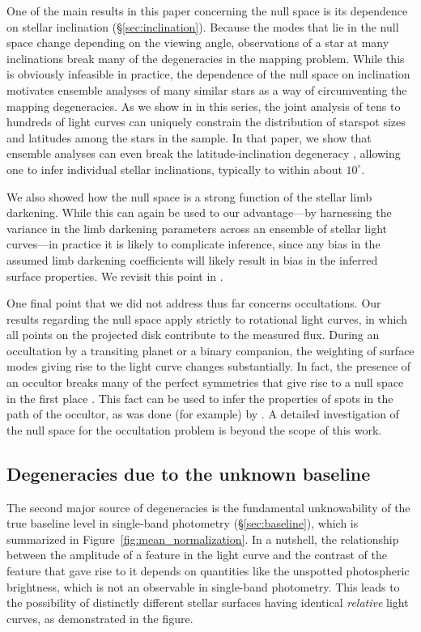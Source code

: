 \documentclass[modern]{aastex62}
\begin{document}
One of the main results in this paper concerning the null space is its
dependence on stellar inclination (\S\ref{sec:inclination}). Because the modes that lie in the null
space change depending on the viewing angle, observations of a star at many
inclinations break many of the degeneracies in the mapping problem. While
this is obviously infeasible in practice, the dependence of the null
space on inclination motivates ensemble analyses of many similar stars
as a way of circumventing the mapping degeneracies. As we show in
 in this series, the joint analysis of tens to hundreds
of light curves can uniquely constrain the distribution of starspot
sizes and latitudes among the stars in the sample. In that paper,
we show that ensemble analyses can
even break the latitude-inclination degeneracy \citep[e.g.,][]{Walkowicz2013},
allowing one to infer individual stellar inclinations, typically to within
about $10^\circ$.

We also showed how the null space is a strong function of the stellar limb
darkening. While this can again be used to our advantage---by harnessing the
variance in the limb darkening parameters across an ensemble of stellar
light curves---in practice it is likely to complicate inference, since
any bias in the assumed limb darkening coefficients will likely result in
bias in the inferred surface properties. We revisit this point in
.

One final point that we did not address thus far concerns occultations.
Our results regarding the null space apply strictly to rotational light curves,
in which all points on the projected disk contribute to the measured flux.
During an occultation by a transiting planet or a binary companion, the
weighting of surface modes giving rise to the light curve changes
substantially. In fact, the presence of an occultor breaks many of the perfect
symmetries that give rise to a null space in the first place
\citep[e.g.,][]{Luger2019}. This fact can be used to infer the properties
of spots in the path of the occultor, as was done (for example)
by \citet[e.g.,][]{Morris2017}. A detailed investigation of the null space
for the occultation problem is beyond the scope of this work.

\subsection{Degeneracies due to the unknown baseline}

The second major source of degeneracies is the fundamental
unknowability of the true baseline level in single-band
photometry (\S\ref{sec:baseline}), which is summarized in
Figure~\ref{fig:mean_normalization}. In a nutshell, the relationship
between the amplitude of a feature in the light curve and the contrast
of the feature that gave rise to it depends on quantities like the
unspotted photospheric brightness, which is not an observable in
single-band photometry. This leads to the possibility of distinctly
different stellar surfaces having identical \emph{relative}
light curves, as demonstrated in the figure.
\end{document}
